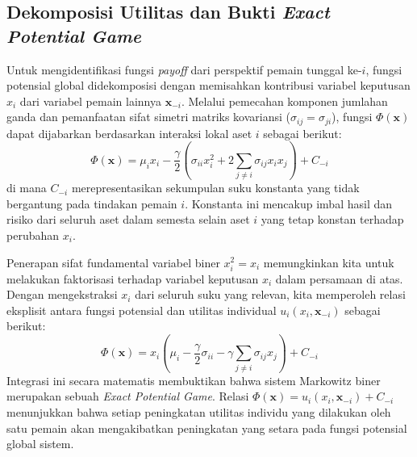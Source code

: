 \subsection{Dekomposisi Utilitas dan Bukti \textit{Exact Potential Game}}
Untuk mengidentifikasi fungsi \textit{payoff} dari perspektif pemain tunggal ke-$i$, fungsi potensial global didekomposisi dengan memisahkan kontribusi variabel keputusan $x_i$ dari variabel pemain lainnya $\mathbf{x}_{-i}$. Melalui pemecahan komponen jumlahan ganda dan pemanfaatan sifat simetri matriks kovariansi ($\sigma_{ij} = \sigma_{ji}$), fungsi $\Phi(\mathbf{x})$ dapat dijabarkan berdasarkan interaksi lokal aset $i$ sebagai berikut:
\begin{equation}
    \Phi(\mathbf{x}) = \mu_i x_i - \frac{\gamma}{2} \left( \sigma_{ii} x_i^2 + 2 \sum_{j \neq i} \sigma_{ij} x_i x_j \right) + C_{-i}
\end{equation}
di mana $C_{-i}$ merepresentasikan sekumpulan suku konstanta yang tidak bergantung pada tindakan pemain $i$. Konstanta ini mencakup imbal hasil dan risiko dari seluruh aset dalam semesta selain aset $i$ yang tetap konstan terhadap perubahan $x_i$.

Penerapan sifat fundamental variabel biner $x_i^2 = x_i$ memungkinkan kita untuk melakukan faktorisasi terhadap variabel keputusan $x_i$ dalam persamaan di atas. Dengan mengekstraksi $x_i$ dari seluruh suku yang relevan, kita memperoleh relasi eksplisit antara fungsi potensial dan utilitas individual $u_i(x_i, \mathbf{x}_{-i})$ sebagai berikut:
\begin{equation}
    \Phi(\mathbf{x}) = x_i \left( \mu_i - \frac{\gamma}{2} \sigma_{ii} - \gamma \sum_{j \neq i} \sigma_{ij} x_j \right) + C_{-i}
\end{equation}
Integrasi ini secara matematis membuktikan bahwa sistem Markowitz biner merupakan sebuah \textit{Exact Potential Game}. Relasi $\Phi(\mathbf{x}) = u_i(x_i, \mathbf{x}_{-i}) + C_{-i}$ menunjukkan bahwa setiap peningkatan utilitas individu yang dilakukan oleh satu pemain akan mengakibatkan peningkatan yang setara pada fungsi potensial global sistem.
